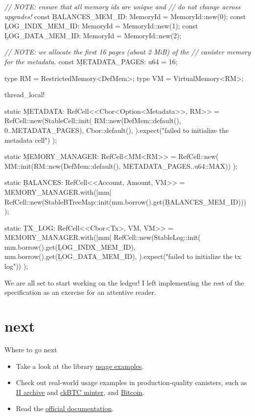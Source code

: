 \documentclass{article}
\begin{document}
\begin{code}[rust]
\emph{// NOTE: ensure that all memory ids are unique and}
\emph{// do not change across upgrades!}
const \b{BALANCES_MEM_ID}: MemoryId = MemoryId::new(0);
const \b{LOG_INDX_MEM_ID}: MemoryId = MemoryId::new(1);
const \b{LOG_DATA_MEM_ID}: MemoryId = MemoryId::new(2);

\emph{// NOTE: we allocate the first 16 pages (about 2 MiB) of the}
\emph{// canister memory for the metadata.}
const \b{METADATA_PAGES}: u64 = 16;

type RM = RestrictedMemory<DefMem>;
type VM = VirtualMemory<RM>;

thread_local! {
  static \b{METADATA}: RefCell<\href{#stable-cell}{}<Cbor<Option<Metadata>>, RM>> =
    RefCell::new(StableCell::init(
        RM::new(DefMem::default(), 0..METADATA_PAGES),
        Cbor::default(),
      ).expect("failed to initialize the metadata cell")
    );

  static \b{MEMORY_MANAGER}: RefCell<MM<RM>> = RefCell::new(
    MM::init(RM::new(DefMem::default(), METADATA_PAGES..u64::MAX))
  );

  static \b{BALANCES}: RefCell<\href{#stable-btree}{}<Account, Amount, VM>> =
    MEMORY_MANAGER.with(|mm| {
      RefCell::new(StableBTreeMap::init(mm.borrow().get(\b{BALANCES_MEM_ID})))
    });

  static \b{TX_LOG}: RefCell<\href{#stable-log}{}<Cbor<Tx>, VM, VM>> =
    MEMORY_MANAGER.with(|mm| {
      RefCell::new(StableLog::init(
        mm.borrow().get(\b{LOG_INDX_MEM_ID}),
        mm.borrow().get(\b{LOG_DATA_MEM_ID}),
      ).expect("failed to initialize the tx log"))
    });
}
\end{code}

We are all set to start working on the ledger!
I left implementing the rest of the specification as an exercise for an attentive reader.

\section{next}{Where to go next}
\begin{itemize}
  \item Take a look at the library \href{https://github.com/dfinity/stable-structures/tree/main/examples/src}{usage examples}.
  \item Check out real-world usage examples in production-quality canisters, such as \href{https://github.com/dfinity/internet-identity/blob/97e8d968aba653c8857537ecd541b35de5085608/src/archive/src/main.rs}{II archive} and \href{https://github.com/dfinity/ic/blob/df57b720fd0ceed70f021f4812c797fb40d97503/rs/bitcoin/ckbtc/minter/src/storage.rs}{ckBTC minter}, and \href{https://github.com/dfinity/bitcoin-canister/blob/9242d5f9a784ac115c2042fd09705dd9321ff7b7/canister/src/block_header_store.rs#L13}{Bitcoin}.
  \item Read the \href{https://docs.rs/ic-stable-structures/latest/ic_stable_structures/}{official documentation}.
\end{itemize}
\end{document}
